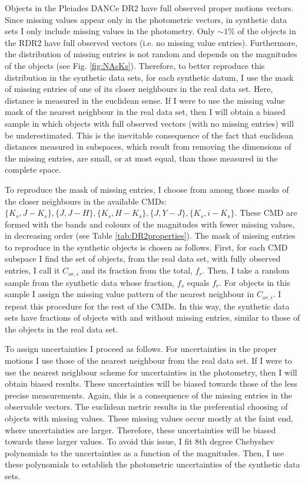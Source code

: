 Objects in the Pleiades DANCe DR2  have full observed proper motions vectors. Since missing values appear only in the photometric vectors, in synthetic data sets I only include missing values in the photometry. Only $\sim1\%$ of the objects in the RDR2 have full observed vectors (i.e. no missing value entries). Furthermore, the distribution of missing entries is not random and depends on the magnitudes of the objects (see Fig. \ref{fig:NAsKs}). Therefore, to better reproduce this distribution in the synthetic data sets, for each synthetic datum, I use the mask of missing entries of one of its closer neighbours in the real data set. Here, distance is measured in the euclidean sense. If I were to use the missing value mask of the nearest neighbour in the real data set, then I will obtain a biased sample in which objects with full observed vectors (with no missing entries) will be underestimated. This is the inevitable consequence of the fact that euclidean distances measured in subspaces, which result from removing the dimensions of the missing entries, are small, or at most equal, than those measured in the complete space. 

To reproduce the mask of missing entries, I choose from among those masks of the closer neighbours in the available CMDs: $\{K_s,J-K_s\},\{J,J-H\},\{K_s,H-K_s\},\{J,Y-J\},\{K_s,i-K_s\}$. These CMD are formed with the bands and colours of the magnitudes with fewer missing values, in decreasing order (see Table \ref{tab:DR2properties}).  The mask of missing entries to reproduce in the synthetic objects is chosen as follows. First, for each CMD subspace I find the set of objects, from the real data set, with fully observed entries, I call it $C_{or,i}$ and its fraction from the total, $f_r$. Then, I take a random sample from the synthetic data whose fraction, $f_s$ equals $f_r$. For objects in this sample I assign the missing value pattern of the nearest neighbour in $C_{or,i}$. I repeat this procedure for the rest of the CMDs. In this way, the synthetic data sets have fractions of objects with and without missing entries, similar to those of the objects in the real data set.

To assign uncertainties I proceed as follows. For uncertainties in the proper motions I use those of the nearest neighbour from the real data set. If I were to use the nearest neighbour scheme for uncertainties in the photometry, then I will obtain biased results. These uncertainties will be biased towards those of the less precise measurements. Again, this is a consequence of the missing entries in the observable vectors. The euclidean metric results in the preferential choosing of objects with missing values. These missing values occur mostly at the faint end, where uncertainties are larger. Therefore, these uncertainties will be biased towards these larger values. To avoid this issue, I fit 8th degree Chebyshev polynomials to the uncertainties as a function of the magnitudes. Then, I use these polynomials to establish the photometric uncertainties of the synthetic data sets.

